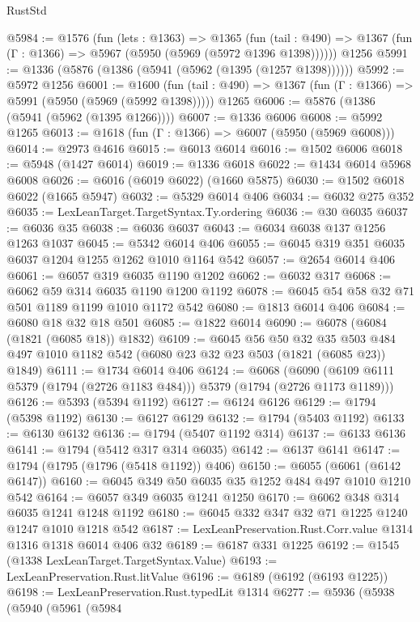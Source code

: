 \begin{lexlean}{RustStd}
\begin{coremodule}
{\begin{coremodule}
{{{{{{{{{{{{{{@5984 := @1576
    (fun (lets : @1363) =>
    @1365
      (fun (tail : @490) => @1367 (fun (Γ : @1366) => @5967 (@5950 (@5969 (@5972 @1396 @1398))))))
    @1256
@5991 := @1336 (@5876 (@1386 (@5941 (@5962 (@1395 (@1257 @1398))))))
@5992 := @5972 @1256
@6001 := @1600
    (fun (tail : @490) => @1367 (fun (Γ : @1366) => @5991 (@5950 (@5969 (@5992 @1398)))))
    @1265
@6006 := @5876 (@1386 (@5941 (@5962 (@1395 @1266))))
@6007 := @1336 @6006
@6008 := @5992 @1265
@6013 := @1618 (fun (Γ : @1366) => @6007 (@5950 (@5969 @6008)))
@6014 := @2973 @4616
@6015 := @6013 @6014
@6016 := @1502 @6006
@6018 := @5948 (@1427 @6014)
@6019 := @1336 @6018
@6022 := @1434 @6014 @5968 @6008
@6026 := @6016 (@6019 @6022) (@1660 @5875)
@6030 := @1502 @6018 @6022 (@1665 @5947)
@6032 := @5329 @6014 @406
@6034 := @6032 @275 @352
@6035 := LexLeanTarget.TargetSyntax.Ty.ordering
@6036 := @30 @6035
@6037 := @6036 @35
@6038 := @6036 @6037
@6043 := @6034 @6038 @137 @1256 @1263 @1037
@6045 := @5342 @6014 @406
@6055 := @6045 @319 @351 @6035 @6037 @1204 @1255 @1262 @1010 @1164 @542
@6057 := @2654 @6014 @406
@6061 := @6057 @319 @6035 @1190 @1202
@6062 := @6032 @317
@6068 := @6062 @59 @314 @6035 @1190 @1200 @1192
@6078 := @6045 @54 @58 @32 @71 @501 @1189 @1199 @1010 @1172 @542
@6080 := @1813 @6014 @406
@6084 := @6080 @18 @32 @18 @501
@6085 := @1822 @6014
@6090 := @6078 (@6084 (@1821 (@6085 @18)) @1832)
@6109 := @6045
    @56
    @50
    @32
    @35
    @503
    @484
    @497
    @1010
    @1182
    @542
    (@6080 @23 @32 @23 @503 (@1821 (@6085 @23)) @1849)
@6111 := @1734 @6014 @406
@6124 := @6068
    (@6090 (@6109 @6111 @5379 (@1794 (@2726 @1183 @484))) @5379 (@1794 (@2726 @1173 @1189)))
@6126 := @5393 (@5394 @1192)
@6127 := @6124 @6126
@6129 := @1794 (@5398 @1192)
@6130 := @6127 @6129
@6132 := @1794 (@5403 @1192)
@6133 := @6130 @6132
@6136 := @1794 (@5407 @1192 @314)
@6137 := @6133 @6136
@6141 := @1794 (@5412 @317 @314 @6035)
@6142 := @6137 @6141
@6147 := @1794 (@1795 (@1796 (@5418 @1192)) @406)
@6150 := @6055 (@6061 (@6142 @6147))
@6160 := @6045 @349 @50 @6035 @35 @1252 @484 @497 @1010 @1210 @542
@6164 := @6057 @349 @6035 @1241 @1250
@6170 := @6062 @348 @314 @6035 @1241 @1248 @1192
@6180 := @6045 @332 @347 @32 @71 @1225 @1240 @1247 @1010 @1218 @542
@6187 := LexLeanPreservation.Rust.Corr.value @1314 @1316 @1318 @6014 @406 @32
@6189 := @6187 @331 @1225
@6192 := @1545 (@1338 LexLeanTarget.TargetSyntax.Value)
@6193 := LexLeanPreservation.Rust.litValue
@6196 := @6189 (@6192 (@6193 @1225))
@6198 := LexLeanPreservation.Rust.typedLit @1314
@6277 := @5936
    (@5938
      (@5940
        (@5961
          (@5984
}}}}}}}}}}}}}}
\end{coremodule}}
\end{coremodule}
\end{lexlean}
